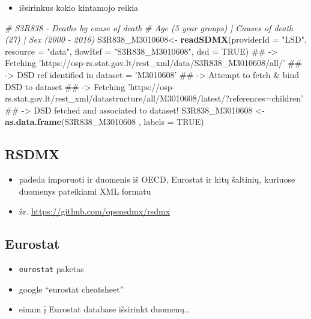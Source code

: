 \documentclass[]{article}
\newenvironment{Shaded}{\begin{snugshade}}{\end{snugshade}}
\newcommand{\KeywordTok}[1]{\textcolor[rgb]{0.13,0.29,0.53}{\textbf{#1}}}
\newcommand{\DataTypeTok}[1]{\textcolor[rgb]{0.13,0.29,0.53}{#1}}
\newcommand{\StringTok}[1]{\textcolor[rgb]{0.31,0.60,0.02}{#1}}
\newcommand{\CommentTok}[1]{\textcolor[rgb]{0.56,0.35,0.01}{\textit{#1}}}
\newcommand{\OtherTok}[1]{\textcolor[rgb]{0.56,0.35,0.01}{#1}}
\newcommand{\NormalTok}[1]{#1}
\providecommand{\tightlist}{%
  \setlength{\itemsep}{0pt}\setlength{\parskip}{0pt}}
\begin{document}
\begin{itemize}
\tightlist
\item
  išsirinkus kokio kintamojo reikia
\end{itemize}

\begin{Shaded}
\begin{Highlighting}[]
\CommentTok{# S3R838 - Deaths by cause of death}
\CommentTok{# Age (5 year groups) | Causes of death (27) | Sex (2000 - 2016)}
\NormalTok{S3R838_M3010608<-}\StringTok{ }\KeywordTok{readSDMX}\NormalTok{(}\DataTypeTok{providerId =} \StringTok{"LSD"}\NormalTok{, }
                           \DataTypeTok{resource =} \StringTok{"data"}\NormalTok{, }
                           \DataTypeTok{flowRef =} \StringTok{"S3R838_M3010608"}\NormalTok{, }
                           \DataTypeTok{dsd =} \OtherTok{TRUE}\NormalTok{)}
\NormalTok{## -> Fetching 'https://osp-rs.stat.gov.lt/rest_xml/data/S3R838_M3010608/all/'}
\NormalTok{## -> DSD ref identified in dataset = 'M3010608'}
\NormalTok{## -> Attempt to fetch & bind DSD to dataset}
\NormalTok{## -> Fetching 'https://osp-rs.stat.gov.lt/rest_xml/datastructure/all/M3010608/latest/?references=children'}
\NormalTok{## -> DSD fetched and associated to dataset!}
\NormalTok{S3R838_M3010608 <-}\StringTok{ }\KeywordTok{as.data.frame}\NormalTok{(S3R838_M3010608 , }
                                 \DataTypeTok{labels =} \OtherTok{TRUE}\NormalTok{)}
\end{Highlighting}
\end{Shaded}

\subsection{RSDMX}\label{rsdmx}

\begin{itemize}
\tightlist
\item
  padeda imporuoti ir duomenis iš OECD, Eurostat ir kitų šaltinių,
  kuriuose duomenys pateikiami XML formatu
\item
  žr. \url{https://github.com/opensdmx/rsdmx}
\end{itemize}

\subsection{Eurostat}\label{eurostat}

\begin{itemize}
\tightlist
\item
  \texttt{eurostat} paketas
\item
  google ``eurostat cheatsheet''
\item
  einam į Eurostat database išsirinkt duomenų\ldots{}
\end{itemize}
\end{document}

